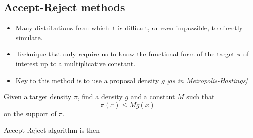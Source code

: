 \begin{slide}
\begin{columns}
\end{columns}

\end{slide}\subsection{Accept-Reject methods}\begin{slide}

\begin{itemize}
\item Many distributions from which it is difficult, or even impossible,
to directly simulate.

\item Technique that only
require us to know the functional form of the target
$\pi$ of interest up to a multiplicative constant.

\item Key to this method is to use a proposal density $g$
{\em [as in Metropolis-Hastings]}
\end{itemize}

\end{slide}\begin{slide}

Given a target density $\pi$, find a density $g$ and a constant $M$ such that
$$
\pi(x) \leq M g(x)
$$
on the support of $\pi$.

\vs\pause
Accept-Reject algorithm is then
{}


\end{slide}
